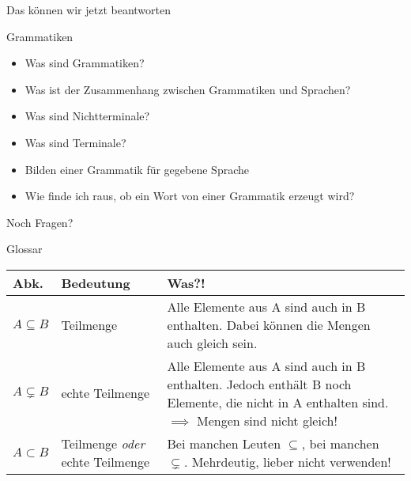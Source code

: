 \begin{frame}[fragile]{Das können wir jetzt beantworten}
	\begin{alertblock}{Grammatiken}
		\begin{itemize}
        	\item Was sind Grammatiken?
			\item Was ist der Zusammenhang zwischen Grammatiken und Sprachen?
			\item Was sind Nichtterminale?
			\item Was sind Terminale?
			\item Bilden einer Grammatik für gegebene Sprache
        	\item Wie finde ich raus, ob ein Wort von einer Grammatik erzeugt wird?
		\end{itemize}
	\end{alertblock}
\end{frame}

\begin{frame}[standout]
  Noch Fragen?
\end{frame}

\begin{frame}[fragile]{Glossar}
    \small
    \begin{tabular}{p{} p{} p{}}
    \toprule
    Abk.&Bedeutung&Was?!\\
    \midrule
        $A \subseteq B$ & Teilmenge & Alle Elemente aus A sind auch in B enthalten. Dabei können die Mengen auch gleich sein.\\
        $A \subsetneq B$ & echte Teilmenge & Alle Elemente aus A sind auch in B enthalten. Jedoch enthält B noch Elemente, die nicht in A enthalten sind.
        $\implies$ Mengen sind nicht gleich!\\
        $A \subset B$ & Teilmenge \emph{oder} echte Teilmenge & Bei manchen Leuten $\subseteq$, bei manchen $\subsetneq$. Mehrdeutig, lieber nicht verwenden!\\
    \bottomrule
    \end{tabular}
\end{frame}




